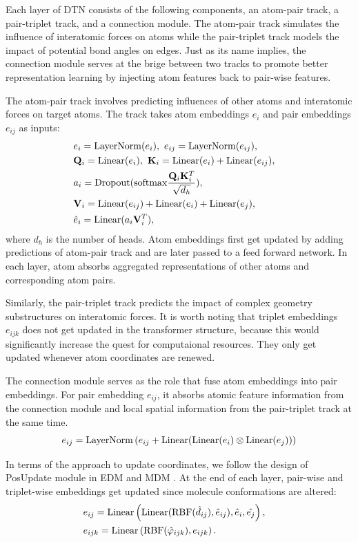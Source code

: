 \documentclass[letterpaper]{article} %
\begin{document}
Each layer of DTN consists of the following components, an atom-pair track, a pair-triplet track, and a connection module. The atom-pair track simulates the influence of interatomic forces on atoms while the pair-triplet track models the impact of potential bond angles on edges. Just as its name implies, the connection module serves at the brige between two tracks to promote better representation learning by injecting atom features back to pair-wise features.

The atom-pair track involves predicting influences of other atoms and interatomic forces on target atoms. The track takes atom embeddings $e_i$ and pair embeddings $e_{ij}$ as inputs:
\begin{eqnarray}
&e_i = {\rm LayerNorm}(e_i), \ e_{ij} = {\rm LayerNorm}(e_{ij}),& \\
&\mathbf{Q}_i = {\rm Linear}(e_i), \ \mathbf{K}_i = {\rm Linear}(e_i) + {\rm Linear}(e_{ij}),& \\
&a_i = {\rm Dropout}({\rm softmax} \frac{\mathbf{Q}_i \mathbf{K}_i^T}{\sqrt{d_h}}), & \\
&\mathbf{V}_i = {\rm Linear}(e_{ij}) + {\rm Linear}(e_{i}) + {\rm Linear}(e_{j}),& \\
&\hat{e}_i = {\rm Linear}(a_i \mathbf{V}_i^T),&
\end{eqnarray}
where $d_h$ is the number of heads. Atom embeddings first get updated by adding predictions of atom-pair track and are later passed to a feed forward network. In each layer, atom absorbs aggregated representations of other atoms and corresponding atom pairs.

Similarly, the pair-triplet track predicts the impact of complex geometry substructures on interatomic forces.
It is worth noting that triplet embeddings $e_{ijk}$ does not get updated in the transformer structure, because this would significantly increase the quest for computaional resources. They only get updated whenever atom coordinates are renewed.

The connection module serves as the role that fuse atom embeddings into pair embeddings. For pair embedding $e_{ij}$, it absorbs atomic feature information from the connection module and local spatial information from the pair-triplet track at the same time.
\begin{equation}
e_{ij} = {\rm LayerNorm}\left(e_{ij} + {\rm Linear}({\rm Linear}(e_i) \otimes {\rm Linear}(e_j))\right)
\end{equation}

In terms of the approach to update coordinates, we follow the design of PosUpdate module in EDM \cite{edm_22_hoogeboom} and MDM \cite{mdm_23_huang}. At the end of each layer, pair-wise and triplet-wise embeddings get updated since molecule conformations are altered:
\begin{eqnarray}
&e_{ij} = {\rm Linear}\left({\rm Linear}({\rm RBF}(\hat{d}_{ij}), \hat{e}_{ij}), \hat{e}_i, \hat{e_j}\right),&\\
&e_{ijk} = {\rm Linear}\left({\rm RBF}(\hat{\varphi}_{ijk}), e_{ijk}\right). &
\end{eqnarray}
\end{document}
